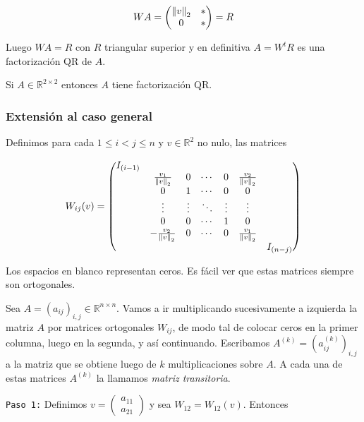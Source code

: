 \[WA = \begin{pmatrix}
\left\lVert v\right\rVert_2 & * \\
0 & *
\end{pmatrix} = R\]

Luego $WA = R$ con $R$ triangular superior y en definitiva $A = W^tR$ es una factorización QR de $A$.

\begin{propo}
Si $A \in \mathbb{R}^{2 \times 2}$ entonces $A$ tiene factorización QR.
\end{propo}

\subsubsection{Extensión al caso general}
Definimos para cada $1 \leq i < j \leq n$ y $v \in \mathbb{R}^2$ no nulo, las matrices

\[W_{ij}(v) = \begin{pmatrix}
I_{(i-1)}	&												&			&															& \\
		& \frac{v_1}{\left\lVert v\right\rVert_2}	& 0 			& \cdots & 0 & \frac{v_2}{\left\lVert v\right\rVert_2} 	& \\
		& 0												& 1 			& \cdots & 0 & 0												& \\
		& \vdots											& \vdots 	& \ddots & \vdots & \vdots										& \\
		& 0												& 0			& \cdots & 1 & 0												& \\
		& -\frac{v_2}{\left\lVert v\right\rVert_2}	& 0			& \cdots	 & 0 & \frac{v_1}{\left\lVert v\right\rVert_2}	& \\
		&												&			&		 &	 &												& I_{(n - j)}
\end{pmatrix}\]

Los espacios en blanco representan ceros. Es fácil ver que estas matrices siempre son ortogonales. 

Sea $A = (a_{ij})_{i, j} \in \mathbb{R}^{n \times n}$. Vamos a ir multiplicando sucesivamente a izquierda la matriz $A$ por matrices ortogonales $W_{ij}$, de modo tal de colocar ceros en la primer columna, luego en la segunda, y así continuando. Escribamos $A^{(k)} = (a^{(k)}_{ij})_{i, j}$ a la matriz que se obtiene luego de $k$ multiplicaciones sobre $A$. A cada una de estas matrices $A^{(k)}$ la llamamos \textit{matriz transitoria}.

\texttt{Paso 1:} Definimos $v = \begin{pmatrix}a_{11} \\ a_{21}\end{pmatrix}$ y sea $W_{12} = W_{12}(v)$. Entonces

